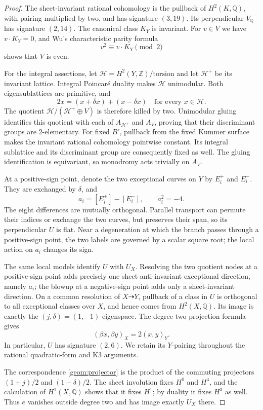 \documentclass[11pt]{amsart}
\newcommand{\Q}{\mathbb Q}
\newcommand{\Z}{\mathbb Z}
\theoremstyle{definition}
\theoremstyle{remark}
\numberwithin{equation}{section}
\begin{document}
\begin{proof}
The sheet-invariant rational cohomology is the pullback of
$H^2(K,\Q)$, with pairing multiplied by two, and has signature
$(3,19)$.  Its perpendicular $V_\Q$ has signature $(2,14)$.
The canonical class $K_Y$ is invariant.  For $v\in V$ we have
$v\cdot K_Y=0$, and Wu's characteristic parity formula
\cite[Theorem~11.14 and Problem~14-B]{MilnorStasheff}
\[
 v^2\equiv v\cdot K_Y\pmod2
\]
shows that $V$ is even.

For the integral assertions, let
$\mathcal H=H^2(Y,\Z)/\mathrm{torsion}$ and let $\mathcal H^+$ be
its invariant lattice.  Integral Poincaré duality makes $\mathcal H$
unimodular.  Both eigensublattices are primitive, and
\[
 2x=(x+\delta x)+(x-\delta x)
 \quad\text{for every }x\in\mathcal H.
\]
The quotient $\mathcal H/(\mathcal H^+\oplus V)$ is therefore killed
by two.  Unimodular gluing identifies this quotient with each of
$A_{\mathcal H^+}$ and $A_V$, proving that their discriminant groups
are $2$-elementary.  For fixed $B'$, pullback from the fixed Kummer
surface makes the invariant rational cohomology pointwise constant.
Its integral sublattice and its discriminant group are consequently
fixed as well.  The gluing identification is equivariant, so
monodromy acts trivially on $A_V$.

At a positive-sign point, denote the two exceptional curves on $Y$
by $E_i^+$ and $E_i^-$.  They are exchanged by $\delta$, and
\[
 a_i=[E_i^+]-[E_i^-],\qquad a_i^2=-4.
\]
The eight differences are mutually orthogonal.  Parallel transport
can permute their indices or exchange the two curves, but preserves
their span, so its perpendicular $U$ is flat.  Near a degeneration
at which the branch passes through a positive-sign point, the two
labels are governed by a scalar square root; the local action on
$a_i$ changes its sign.

The same local models identify $U$ with $U_X$.  Resolving the two
quotient nodes at a positive-sign point adds precisely one
sheet-anti-invariant exceptional direction, namely $a_i$; the blowup
at a negative-sign point adds only a sheet-invariant direction.
On a common resolution of $X\dashrightarrow Y$, pullback of a class
in $U$ is orthogonal to all exceptional classes over $X$, and hence
comes from $H^2(X,\Q)$.  Its image is exactly the
$(j,\delta)=(1,-1)$ eigenspace.  The degree-two projection formula
gives
\[
 (\beta x,\beta y)_X=2(x,y)_Y.
\]
In particular, $U$ has signature $(2,6)$.  We retain its $Y$-pairing
throughout the rational quadratic-form and K3 arguments.

The correspondence \eqref{geom:projector} is the product of the
commuting projectors $(1+j)/2$ and $(1-\delta)/2$.  The sheet
involution fixes $H^0$ and $H^4$, and the calculation of
$H^1(X,\Q)$ shows that it fixes $H^1$; by duality it fixes $H^3$
as well.  Thus $e$ vanishes outside degree two and has image exactly
$U_X$ there.


\end{proof}
\end{document}
